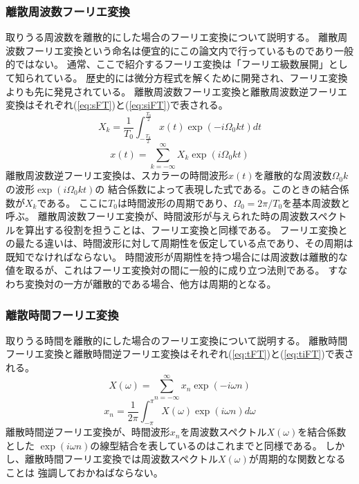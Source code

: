 \subsubsection{離散周波数フーリエ変換}
取りうる周波数を離散的にした場合のフーリエ変換について説明する。
離散周波数フーリエ変換という命名は便宜的にこの論文内で行っているものであり一般的ではない。
通常、ここで紹介するフーリエ変換は「フーリエ級数展開」として知られている。
歴史的には微分方程式を解くために開発され、フーリエ変換よりも先に発見されている。
離散周波数フーリエ変換と離散周波数逆フーリエ変換はそれぞれ(\ref{eq:sFT})と(\ref{eq:siFT})で表される。
\begin{equation}
    X_k=\frac{1}{T_0}\int_{-\frac{T_0}{2}}^{\frac{T_0}{2}} x(t)\exp(-i\Omega_0 kt)dt
    \label{eq:sFT}
\end{equation}
\begin{equation}
    x(t)=\sum_{k=-\infty}^{\infty} X_k \exp(i\Omega_0 k t)
    \label{eq:siFT}
\end{equation}
離散周波数逆フーリエ変換は、スカラーの時間波形\(x(t)\)を離散的な周波数\(\Omega_0 k\)の波形\(\exp(i\Omega_0 k t)\)の
結合係数によって表現した式である。このときの結合係数が\(X_k\)である。
ここに\(T_0\)は時間波形の周期であり、\(\Omega_0 = 2\pi/T_0\)を基本周波数と呼ぶ。
離散周波数フーリエ変換が、時間波形が与えられた時の周波数スペクトルを算出する役割を担うことは、フーリエ変換と同様である。
フーリエ変換との最たる違いは、時間波形に対して周期性を仮定している点であり、その周期は既知でなければならない。
時間波形が周期性を持つ場合には周波数は離散的な値を取るが、これはフーリエ変換対の間に一般的に成り立つ法則である。
すなわち変換対の一方が離散的である場合、他方は周期的となる。

\subsubsection{離散時間フーリエ変換}
取りうる時間を離散的にした場合のフーリエ変換について説明する。
離散時間フーリエ変換と離散時間逆フーリエ変換はそれぞれ(\ref{eq:tFT})と(\ref{eq:tiFT})で表される。
\begin{equation}
    X(\omega)=\sum_{n = -\infty}^{\infty} x_n \exp(-i\omega n)
    \label{eq:tFT}
\end{equation}
\begin{equation}
    x_n=\frac{1}{2\pi} \int_{-\pi}^{\pi} X(\omega) \exp(i\omega n)d\omega
    \label{eq:tiFT}
\end{equation}
離散時間逆フーリエ変換が、時間波形\(x_n\)を周波数スペクトル\(X(\omega)\)を結合係数とした
\(\exp(i\omega n)\)の線型結合を表しているのはこれまでと同様である。
しかし、離散時間フーリエ変換では周波数スペクトル\(X(\omega)\)が周期的な関数となることは
強調しておかねばならない。

